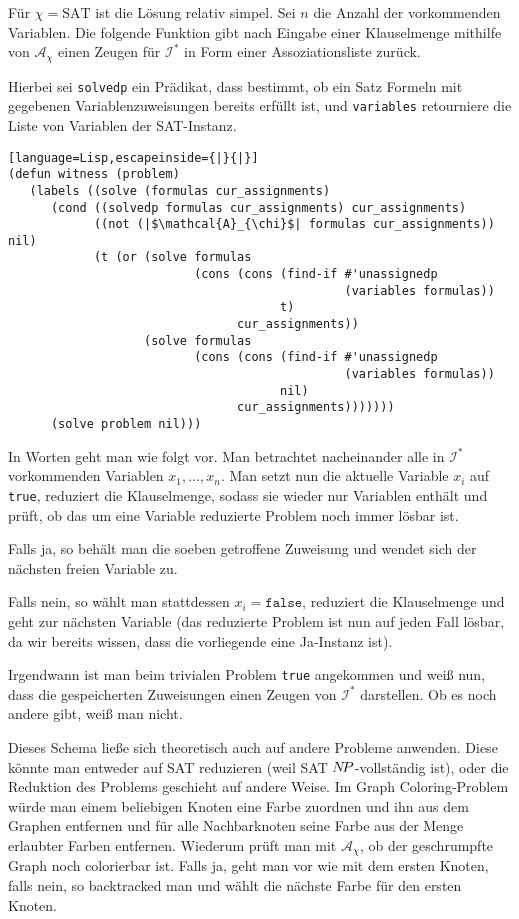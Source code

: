 \documentclass{article}
\begin{document}
Für $\chi = \text{SAT}$ ist die Lösung relativ simpel. Sei $n$ die Anzahl der
vorkommenden Variablen. Die folgende Funktion gibt nach Eingabe einer
Klauselmenge mithilfe von $\mathcal{A}_\chi$ einen Zeugen für $\mathcal{I}^*$ in
Form einer Assoziationsliste zurück.

Hierbei sei \texttt{solvedp} ein Prädikat, dass bestimmt, ob ein Satz Formeln
mit gegebenen Variablenzuweisungen bereits erfüllt ist, und \texttt{variables}
retourniere die Liste von Variablen der SAT-Instanz.

\begin{lstlisting}[language=Lisp,escapeinside={|}{|}]
(defun witness (problem)
   (labels ((solve (formulas cur_assignments)
      (cond ((solvedp formulas cur_assignments) cur_assignments)
            ((not (|$\mathcal{A}_{\chi}$| formulas cur_assignments)) nil)
            (t (or (solve formulas 
                          (cons (cons (find-if #'unassignedp 
                                               (variables formulas))
                                      t) 
                                cur_assignments))
                   (solve formulas 
                          (cons (cons (find-if #'unassignedp 
                                               (variables formulas)) 
                                      nil) 
                                cur_assignments)))))))
      (solve problem nil)))
\end{lstlisting}

In Worten geht man wie folgt vor. Man betrachtet nacheinander alle in
$\mathcal{I}^*$ vorkommenden Variablen $x_1,\ldots,x_n$. Man setzt nun die
aktuelle Variable $x_i$ auf \texttt{true}, reduziert die Klauselmenge, sodass sie
wieder nur Variablen enthält und prüft, ob das um eine Variable reduzierte
Problem noch immer lösbar ist. 

Falls ja, so behält man die soeben getroffene
Zuweisung und wendet sich der nächsten freien Variable zu. 

Falls nein, so wählt man stattdessen $x_i = \texttt{false}$, reduziert die
Klauselmenge und geht zur nächsten Variable (das reduzierte Problem ist nun auf
jeden Fall lösbar, da wir bereits wissen, dass die vorliegende eine
Ja-Instanz ist).

Irgendwann ist man beim trivialen Problem \texttt{true} angekommen und weiß nun,
dass die gespeicherten Zuweisungen einen Zeugen von $\mathcal{I}^*$ darstellen.
Ob es noch andere gibt, weiß man nicht.

Dieses Schema ließe sich theoretisch auch auf andere Probleme anwenden. Diese
könnte man entweder auf SAT reduzieren (weil SAT $N\kern-2ptP$-vollständig ist), oder
die Reduktion des Problems geschieht auf andere Weise. Im Graph Coloring-Problem
würde man einem beliebigen Knoten eine Farbe zuordnen und ihn aus dem Graphen
entfernen und für alle Nachbarknoten seine Farbe aus der Menge erlaubter Farben
entfernen. Wiederum prüft man mit $\mathcal{A}_\chi$, ob der geschrumpfte Graph
noch colorierbar ist. Falls ja, geht man vor wie mit dem ersten Knoten, falls
nein, so backtracked man und wählt die nächste Farbe für den ersten Knoten.
\end{document}
